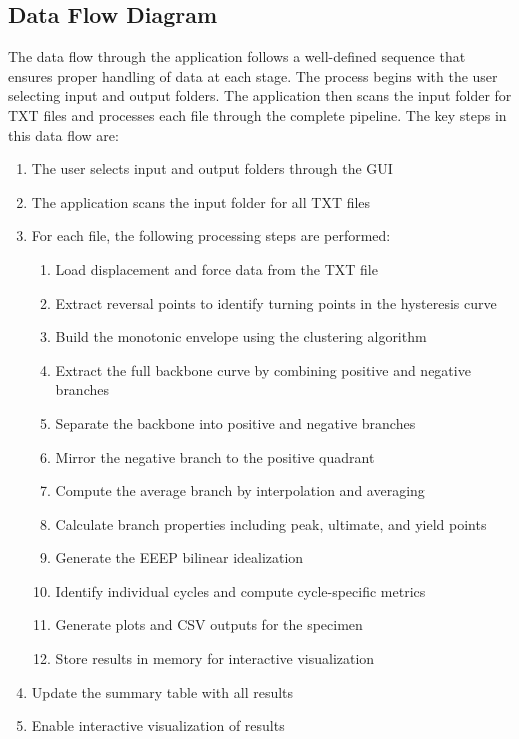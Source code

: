 \documentclass[11pt,a4paper]{article}
\begin{document}
\subsection{Data Flow Diagram}

The data flow through the application follows a well-defined sequence that ensures proper handling of data at each stage. The process begins with the user selecting input and output folders. The application then scans the input folder for TXT files and processes each file through the complete pipeline. The key steps in this data flow are:

\begin{enumerate}
    \item The user selects input and output folders through the GUI
    \item The application scans the input folder for all TXT files
    \item For each file, the following processing steps are performed:
    \begin{enumerate}
        \item Load displacement and force data from the TXT file
        \item Extract reversal points to identify turning points in the hysteresis curve
        \item Build the monotonic envelope using the clustering algorithm
        \item Extract the full backbone curve by combining positive and negative branches
        \item Separate the backbone into positive and negative branches
        \item Mirror the negative branch to the positive quadrant
        \item Compute the average branch by interpolation and averaging
        \item Calculate branch properties including peak, ultimate, and yield points
        \item Generate the EEEP bilinear idealization
        \item Identify individual cycles and compute cycle-specific metrics
        \item Generate plots and CSV outputs for the specimen
        \item Store results in memory for interactive visualization
    \end{enumerate}
    \item Update the summary table with all results
    \item Enable interactive visualization of results
\end{enumerate}
\end{document}
